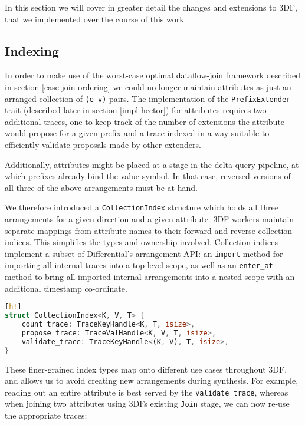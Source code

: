 \documentclass[../index.tex]{subfiles}
\begin{document}
In this section we will cover in greater detail the changes and
extensions to 3DF, that we implemented over the course of this work.

\subsection{Indexing}

In order to make use of the worst-case optimal dataflow-join framework
described in section \ref{case-join-ordering} we could no longer
maintain attributes as just an arranged collection of \texttt{(e v)}
pairs. The implementation of the \texttt{PrefixExtender} trait
(described later in section \ref{impl-hector}) for attributes requires
two additional traces, one to keep track of the number of extensions
the attribute would propose for a given prefix and a trace indexed in
a way suitable to efficiently validate proposals made by other
extenders.

Additionally, attributes might be placed at a stage in the delta query
pipeline, at which prefixes already bind the value symbol. In that
case, reversed versions of all three of the above arrangements must be
at hand.

We therefore introduced a \texttt{CollectionIndex} structure which
holds all three arrangements for a given direction and a given
attribute. 3DF workers maintain separate mappings from attribute names
to their forward and reverse collection indices. This simplifies the
types and ownership involved. Collection indices implement a subset of
Differential's arrangement API: an \texttt{import} method for
importing all internal traces into a top-level scope, as well as an
\texttt{enter\_at} method to bring all imported internal arrangements
into a nested scope with an additional timestamp co-ordinate.

\begin{lstlisting}[language=Rust, style=colouredRust][h!]
struct CollectionIndex<K, V, T> {
    count_trace: TraceKeyHandle<K, T, isize>,
    propose_trace: TraceValHandle<K, V, T, isize>,
    validate_trace: TraceKeyHandle<(K, V), T, isize>,
}
\end{lstlisting}

These finer-grained index types map onto different use cases
throughout 3DF, and allows us to avoid creating new arrangements
during synthesis. For example, reading out an entire attribute is best
served by the \texttt{validate\_trace}, whereas when joining two
attributes using 3DFs existing \texttt{Join} stage, we can now re-use
the appropriate traces:
\end{document}
